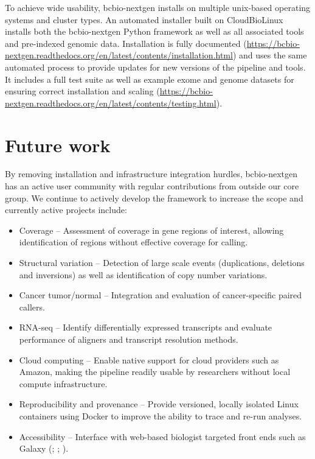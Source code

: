 \documentclass{frontiersSCNS}
\begin{document}
To achieve wide usability, bcbio-nextgen installs on multiple unix-based operating
systems and cluster types. An automated installer built on
CloudBioLinux~\citep{krampis_cloud_2012} installs both the bcbio-nextgen Python
framework as well as all associated tools and pre-indexed genomic
data. Installation is fully documented
(\url{https://bcbio-nextgen.readthedocs.org/en/latest/contents/installation.html})
and uses the same automated process to provide updates for new versions of the
pipeline and tools. It includes a full test suite as well as example exome and
genome datasets for ensuring correct installation and scaling
(\url{https://bcbio-nextgen.readthedocs.org/en/latest/contents/testing.html}).

\section*{Future work}

By removing installation and infrastructure integration hurdles,
bcbio-nextgen has an active user community with regular contributions from
outside our core group. We continue to actively develop the framework to increase
the scope and currently active projects include:

\begin{itemize}
  \item Coverage -- Assessment of coverage in gene regions of interest, allowing
    identification of regions without effective coverage for calling.
  \item Structural variation -- Detection of large scale events (duplications,
    deletions and inversions) as well as identification of copy number variations.
  \item Cancer tumor/normal -- Integration and evaluation of cancer-specific
    paired callers.
  \item RNA-seq --  Identify differentially expressed transcripts and evaluate
    performance of aligners and transcript resolution methods.
  \item Cloud computing -- Enable native support for cloud providers such as
    Amazon, making the pipeline readily usable by researchers without local
    compute infrastructure.
  \item Reproducibility and provenance -- Provide versioned, locally isolated
    Linux containers using Docker to improve the ability to trace and re-run
    analyses.
  \item Accessibility -- Interface with web-based biologist targeted front ends
    such as Galaxy (\cite{goecks_galaxy:_2010};
    \cite{giardine_galaxy:_2005}; \cite{blankenberg_galaxy:_2010}).
\end{itemize}
\end{document}
